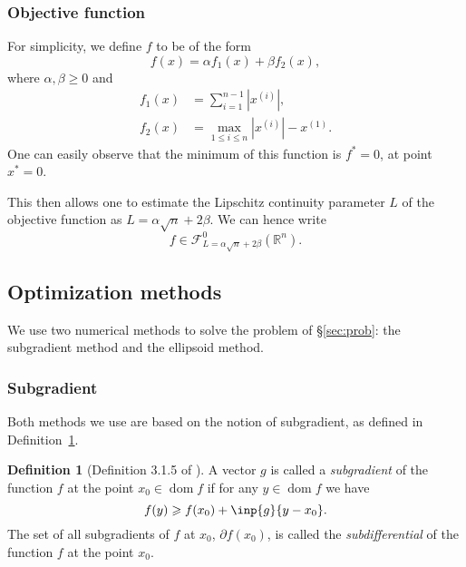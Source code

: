 \documentclass[final]{aomart}
\newcommand{\Rn}{\mathbb{R}^n}
\newtheorem[{}\it]{thm}{Theorem}[section]
\theoremstyle{definition}
\newtheorem{defn}{Definition}[section]
\newtheorem*[{}\it]{notation}{Notation}
\numberwithin{equation}{section}
\newcommand{\secref}[1]{\S\ref{#1}}
\newcommand{\envert}[1]{\left\lvert#1\right\rvert}
\let\abs=\envert
\newcommand{\convex}{\mathscr{F}}
\begin{document}
\subsubsection{Objective function}
\label{sec:fun}
For simplicity, we define \(f\) to be of the form
\begin{equation}
f(x) = \alpha f_1(x) + \beta f_2(x),
\end{equation}
where \(\alpha, \beta \geqslant 0\) and
\begin{align}
f_1(x) &= \sum_{i=1}^{n-1} \abs{x^{(i)}},\\
f_2(x) &= \max_{1 \leqslant i \leqslant n} \abs{x^{(i)}} - x^{(1)}.
\end{align}
One can easily observe that the minimum of this function is \(f^* = 0\), at point \(x^* = 0\).

This then allows one to estimate the Lipschitz continuity parameter \(L\) of the objective function as \(L = \alpha \sqrt{n} + 2 \beta\).
We can hence write
\begin{equation}
f \in \convex^{0}_{L = \alpha \sqrt{n} + 2\beta}(\Rn).
\end{equation}

\subsection{Optimization methods}
We use two numerical methods to solve the problem of \secref{sec:prob}: the subgradient method and the ellipsoid method.

\subsubsection{Subgradient}
Both methods we use are based on the notion of subgradient, as defined in Definition~\ref{def:subgradient}.
\begin{defn}[Definition 3.1.5 of \cite{Nesterov2018}]
	\label{def:subgradient}
	A vector \(g\) is called a \emph{subgradient} of the function \(f\) at the point \(x_0 \in \mathop{\mathrm{dom}} f\) if for any \(y \in \mathop{\mathrm{dom}} f\) we have
	\begin{equation}
	f(y) \geqslant f(x_0) + \inp{g}{y - x_0}.
	\end{equation}
	The set of all subgradients of \(f\) at \(x_0\), \(\partial f(x_0)\), is called the \emph{subdifferential} of the function \(f\) at the point \(x_0\).
\end{defn}
\end{document}

